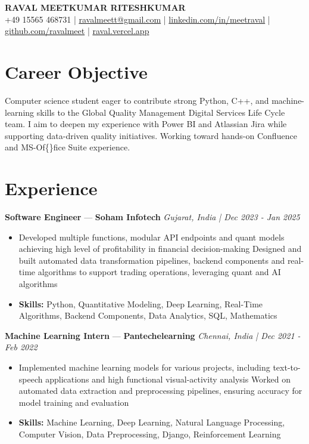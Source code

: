 \documentclass[a4paper,10pt]{article}
\begin{document}
\begin{center}
  {\Large\bfseries RAVAL MEETKUMAR RITESHKUMAR}\\[2pt]
  {\small +49 15565 468731 \;|\; \href{mailto:ravalmeett@gmail.com}{ravalmeett@gmail.com} \;|\; \href{https://www.linkedin.com/in/meetraval/}{linkedin.com/in/meetraval} \;|\; \href{https://github.com/ravalmeet}{github.com/ravalmeet} \;|\; \href{https://raval.vercel.app/}{raval.vercel.app}}
\end{center}
\vspace{-3pt}

\section*{Career Objective}
Computer science student eager to contribute strong Python, C++, and machine-learning skills to the Global Quality Management Digital Services Life Cycle team. I aim to deepen my experience with Power BI and Atlassian Jira while supporting data-driven quality initiatives. Working toward hands-on Confluence and MS-Of\{\}fice Suite experience.\par

\section*{Experience}
\textbf{Software Engineer} — \textbf{Soham Infotech} \hfill \textit{Gujarat, India \;|\; Dec 2023 - Jan 2025}\par
\vspace{1pt}
\begin{itemize}
  \item Developed multiple functions, modular API endpoints and quant models achieving high level of profitability in financial decision-making Designed and built automated data transformation pipelines, backend components and real-time algorithms to support trading operations, leveraging quant and AI algorithms
  \item \textbf{Skills:} Python, Quantitative Modeling, Deep Learning, Real-Time Algorithms, Backend Components, Data Analytics, SQL, Mathematics
\end{itemize}
\vspace{3pt}
\textbf{Machine Learning Intern} — \textbf{Pantechelearning} \hfill \textit{Chennai, India \;|\; Dec 2021 - Feb 2022}\par
\vspace{1pt}
\begin{itemize}
  \item Implemented machine learning models for various projects, including text-to-speech applications and high functional visual-activity analysis Worked on automated data extraction and preprocessing pipelines, ensuring accuracy for model training and evaluation
  \item \textbf{Skills:} Machine Learning, Deep Learning, Natural Language Processing, Computer Vision, Data Preprocessing, Django, Reinforcement Learning
\end{itemize}
\end{document}
